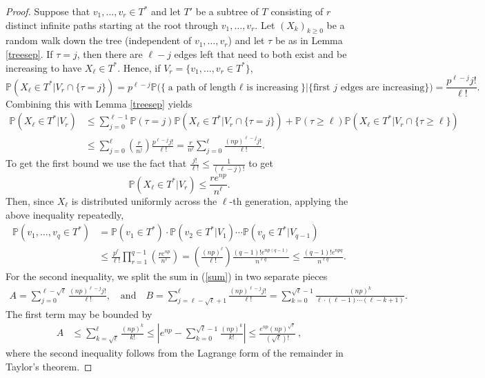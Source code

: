 \documentclass[10pt,a4paper]{amsart}
\newcommand{\prob}{\mathbb{P}} %
\begin{document}
\begin{proof}
Suppose that $v_1,\ldots,v_r \in T^*$ and let $T'$ be a subtree of $T$ consisting of $r$ distinct infinite paths starting at the root through $v_1,\ldots,v_r$. Let $(X_k)_{k \geq 0}$ be a random walk down the tree (independent of $v_1,\ldots,v_r$) and let $\tau$ be as in Lemma \ref{treesep}. If $\tau = j$, then there are $\ell-j$ edges left that need to both exist and be increasing to have $X_\ell \in T^*$. Hence, if $V_r = \{v_1 , \ldots , v_r \in T^*\}$,
$$\prob(X_\ell \in T^* | V_r \cap \{\tau = j\}) = p^{\ell-j}\prob\big(\big\{\text{a path of length $\ell$ is increasing}\big\} \big|\big\{ \text{first $j$ edges are increasing}\big\}\big) = \frac{p^{\ell-j}j!}{\ell!}.$$
Combining this with Lemma \ref{treesep} yields
\begin{align}\label{sum}
\prob(X_\ell \in T^* | V_r)  &
\leq \sum_{j=0}^{\ell-1} \prob(\tau = j)\prob(X_\ell \in T^* | V_r \cap \{\tau = j\}) 
+ \prob(\tau \ge \ell)\prob(X_\ell \in T^* | V_r \cap \{\tau \ge \ell\}) 
 \nonumber \\
& \leq \sum_{j=0}^\ell \left(\frac{r}{n^j}\right)\frac{p^{\ell-j}j!}{\ell!} = \frac{r}{n^\ell}\sum_{j=0}^\ell\frac{(np)^{\ell-j}j!}{\ell!}.
\end{align}
To get the first bound we use the fact that $\frac{j!}{\ell!} \leq \frac{1}{(\ell-j)!}$ to get 
$$\prob(X_\ell \in T^*|V_r) \leq \frac{re^{np}}{n^\ell}.$$
Then, since $X_\ell$ is distributed uniformly across the $\ell$-th generation,  applying the above inequality repeatedly,
\begin{align*}
\prob(v_1,\ldots,v_q \in T^*) &= \prob(v_1 \in T^*) \cdot \prob(v_2 \in T^* | V_1) \cdots \prob(v_q \in T^* | V_{q-1}) \\
&\leq \frac{p^\ell}{\ell!}\prod_{r=1}^{q-1}\left(\frac{re^{np}}{n^\ell}\right) = \left(\frac{(np)^{\ell}}{\ell!}\right)\frac{(q-1)!e^{np(q-1)}}{n^{\ell q}} \leq \frac{(q-1)!e^{npq}}{n^{\ell q}}.
\end{align*} 
For the second inequality, we split the sum in (\ref{sum}) in two separate pieces
\begin{align*}
    A = \sum_{j=0}^{\ell - \sqrt{\ell}}\frac{(np)^{\ell - j}j!}{\ell!}, \quad \text{and} \quad B = \sum_{j=\ell -\sqrt{\ell}+1}^\ell \frac{(np)^{\ell-j}j!}{\ell!} = \sum_{k=0}^{\sqrt{\ell}-1} \frac{(np)^k}{\ell \cdot (\ell-1) \cdots (\ell-k+1)}.
\end{align*}
The first term may be bounded by
\begin{align*}
A &\leq \sum_{k=\sqrt{\ell}}^\ell \frac{(np)^k}{k!} \leq \left|e^{np}- \sum_{k=0}^{\sqrt{\ell}-1} \frac{(np)^k}{k!}\right| \leq \frac{e^{np}(np)^{\sqrt{\ell}}}{(\sqrt{\ell})!}~,
\end{align*}
where the second inequality follows from the Lagrange form of the remainder in Taylor's theorem.


\end{proof}
\end{document}
